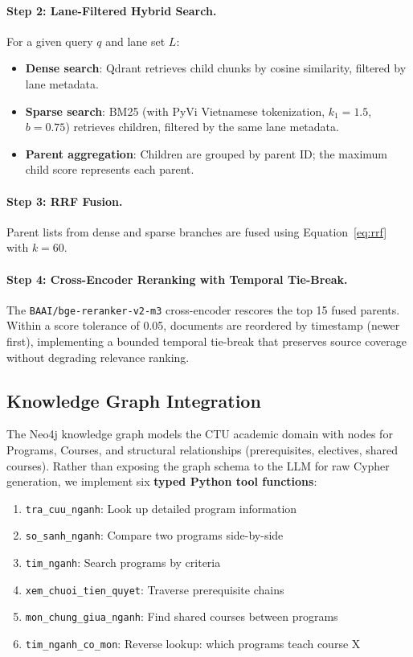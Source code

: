 \documentclass[runningheads]{llncs}
\begin{document}
\paragraph{Step 2: Lane-Filtered Hybrid Search.}
For a given query $q$ and lane set $L$:
\begin{itemize}
    \item \textbf{Dense search}: Qdrant retrieves child chunks by cosine similarity, filtered by lane metadata.
    \item \textbf{Sparse search}: BM25 (with PyVi Vietnamese tokenization, $k_1\!=\!1.5$, $b\!=\!0.75$) retrieves children, filtered by the same lane metadata.
    \item \textbf{Parent aggregation}: Children are grouped by parent ID; the maximum child score represents each parent.
\end{itemize}

\paragraph{Step 3: RRF Fusion.}
Parent lists from dense and sparse branches are fused using Equation~\ref{eq:rrf} with $k=60$.

\paragraph{Step 4: Cross-Encoder Reranking with Temporal Tie-Break.}
The \texttt{BAAI/bge-reranker-v2-m3} cross-encoder rescores the top 15 fused parents. Within a score tolerance of 0.05, documents are reordered by timestamp (newer first), implementing a bounded temporal tie-break that preserves source coverage without degrading relevance ranking.

\subsection{Knowledge Graph Integration}
\label{sec:kg}

The Neo4j knowledge graph models the CTU academic domain with nodes for Programs, Courses, and structural relationships (prerequisites, electives, shared courses). Rather than exposing the graph schema to the LLM for raw Cypher generation, we implement six \textbf{typed Python tool functions}:

\begin{enumerate}
    \item \texttt{tra\_cuu\_nganh}: Look up detailed program information
    \item \texttt{so\_sanh\_nganh}: Compare two programs side-by-side
    \item \texttt{tim\_nganh}: Search programs by criteria
    \item \texttt{xem\_chuoi\_tien\_quyet}: Traverse prerequisite chains
    \item \texttt{mon\_chung\_giua\_nganh}: Find shared courses between programs
    \item \texttt{tim\_nganh\_co\_mon}: Reverse lookup: which programs teach course X
\end{enumerate}
\end{document}
